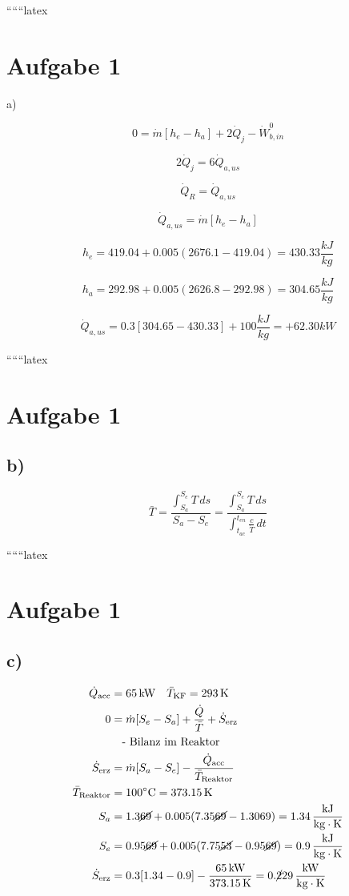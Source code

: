 
``````latex


\section*{Aufgabe 1}

a)

\[
0 = \dot{m} [h_e - h_a] + 2 \dot{Q}_j - \dot{W}_{b,in}^0
\]

\[
2 \dot{Q}_j = 6 \dot{Q}_{a,us}
\]

\[
\dot{Q}_R = \dot{Q}_{a,us}
\]

\[
\dot{Q}_{a,us} = \dot{m} [h_e - h_a]
\]

\[
h_e = 419.04 + 0.005 (2676.1 - 419.04) = 430.33 \frac{kJ}{kg}
\]

\[
h_a = 292.98 + 0.005 (2626.8 - 292.98) = 304.65 \frac{kJ}{kg}
\]

\[
\dot{Q}_{a,us} = 0.3 \left[ 304.65 - 430.33 \right] + 100 \frac{kJ}{kg} = +62.30 kW
\]

``````latex


\section*{Aufgabe 1}

\subsection*{b)}

\[
\bar{T} = \frac{\int_{S_a}^{S_e} T \, ds}{S_a - S_e} = \frac{\int_{S_a}^{S_e} T \, ds}{\int_{t_{ac}}^{t_{en}} \frac{c}{\dot{T}} \, dt}
\]

``````latex


\section*{Aufgabe 1}

\subsection*{c)}

\begin{align*}
\dot{Q}_{\text{acc}} &= 65 \, \text{kW} \quad \bar{T}_{\text{KF}} = 293 \, \text{K} \\
0 &= \dot{m} [S_e - S_a] + \frac{\dot{Q}}{\bar{T}} + \dot{S}_{\text{erz}} \\
&\quad \text{- Bilanz im Reaktor} \\
\dot{S}_{\text{erz}} &= \dot{m} [S_a - S_e] - \frac{\dot{Q}_{\text{acc}}}{\bar{T}_{\text{Reaktor}}} \\
\bar{T}_{\text{Reaktor}} &= 100^\circ \text{C} = 373.15 \, \text{K} \\
S_a &= 1.3 \cancel{69} + 0.005 (7.35 \cancel{69} - 1.3069) = 1.34 \, \frac{\text{kJ}}{\text{kg} \cdot \text{K}} \\
S_e &= 0.95 \cancel{69} + 0.005 (7.75 \cancel{53} - 0.95 \cancel{69}) = 0.9 \, \frac{\text{kJ}}{\text{kg} \cdot \text{K}} \\
\dot{S}_{\text{erz}} &= 0.3 [1.34 - 0.9] - \frac{65 \, \text{kW}}{373.15 \, \text{K}} = 0. \cancel{2} 29 \, \frac{\text{kW}}{\text{kg} \cdot \text{K}}
\end{align*}

